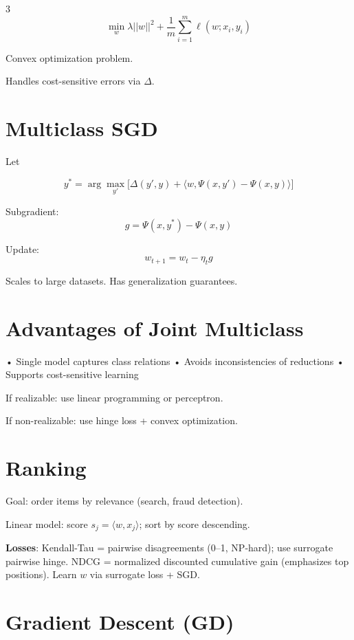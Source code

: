 \documentclass[8pt,fleqn]{extarticle}
\begin{document}
\begin{multicols}{3}
\[
\min_w
\lambda||w||^2
+
\frac1m
\sum_{i=1}^m
\ell(w;x_i,y_i)
\]

Convex optimization problem.

Handles cost-sensitive errors via $\Delta$.


\section*{Multiclass SGD}

Let

\[
y^*=
\arg\max_{y'}
\Big[
\Delta(y',y)
+
\langle w,
\Psi(x,y')-\Psi(x,y)
\rangle
\Big]
\]

Subgradient:
\[
g=\Psi(x,y^*)-\Psi(x,y)
\]

Update:
\[
w_{t+1}=w_t-\eta_t g
\]

Scales to large datasets.
Has generalization guarantees.


\section*{Advantages of Joint Multiclass}

• Single model captures class relations
• Avoids inconsistencies of reductions
• Supports cost-sensitive learning

If realizable:
use linear programming or perceptron.

If non-realizable:
use hinge loss + convex optimization.


\section*{Ranking}

Goal: order items by relevance (search, fraud detection).

Linear model: score $s_j=\langle w,x_j\rangle$; sort by score descending.

\textbf{Losses}: Kendall-Tau = pairwise disagreements (0--1, NP-hard); use surrogate pairwise hinge. NDCG = normalized discounted cumulative gain (emphasizes top positions). Learn $w$ via surrogate loss + SGD.


\section*{Gradient Descent (GD)}


\end{multicols}
\end{document}

